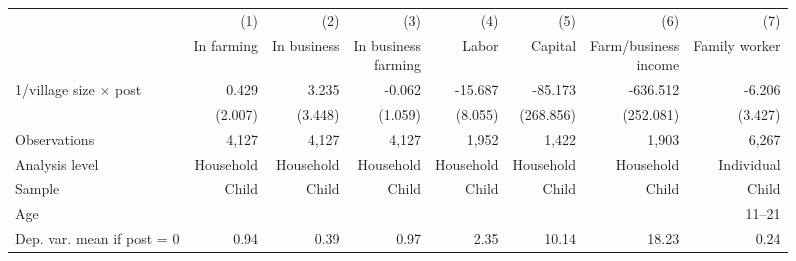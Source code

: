 \begin{center} \begin{threeparttable} \begin{tabular}{l*{7}{r}} \hline \hline 
                    &         (1)&         (2)&         (3)&         (4)&         (5)&         (6)&         (7)\\
                    &  In farming& In business&\shortstack{In business \\farming}&       Labor&     Capital&\shortstack{Farm/business \\ income}&Family worker\\
\hline
1/village size $\times$ post&       0.429&       3.235&      -0.062&     -15.687&     -85.173&    -636.512&      -6.206\\
                    &     (2.007)&     (3.448)&     (1.059)&     (8.055)&   (268.856)&   (252.081)&     (3.427)\\
\hline
Observations        &       4,127&       4,127&       4,127&       1,952&       1,422&       1,903&       6,267\\
Analysis level      &   Household&   Household&   Household&   Household&   Household&   Household&  Individual\\
Sample              &       Child&       Child&       Child&       Child&       Child&       Child&       Child\\
Age                 &            &            &            &            &            &            &      11--21\\
Dep. var. mean if post = 0&        0.94&        0.39&        0.97&        2.35&       10.14&       18.23&        0.24\\
\hline \end{tabular} \end{threeparttable} \end{center}
